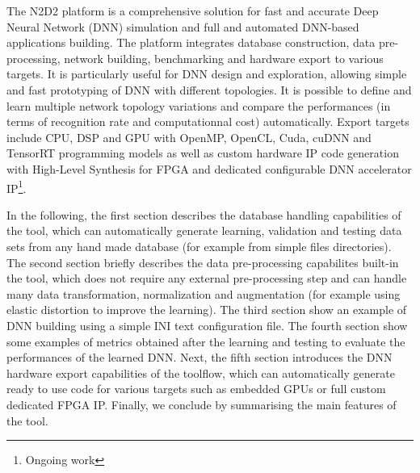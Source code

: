 \documentclass[a4paper,11pt,oneside]{article}
\newif\iffullmanual
\begin{document}
\thispagestyle{empty}
\clearpage


\pagestyle{fancy}

\fancyhf{} %

\renewcommand{\footrulewidth}{0.4pt}%

\fancyfoot[R]{\thepage/\pageref{LastPage}}


\iffullmanual
\setcounter{tocdepth}{4}
\tableofcontents
\clearpage


\section{Presentation}
\fi

The N2D2 platform is a comprehensive solution for fast and accurate Deep Neural
Network (DNN) simulation and full and automated DNN-based applications
building. The platform integrates database construction, data pre-processing,
network building, benchmarking and hardware export to various targets. It is
particularly useful for DNN design and exploration, allowing simple and fast
prototyping of DNN with different topologies. It is possible to define and
learn multiple network topology variations and compare the performances (in
terms of recognition rate and computationnal cost) automatically.
Export targets include CPU, DSP and GPU with OpenMP, OpenCL, Cuda, cuDNN and
TensorRT programming models as well as custom hardware IP code generation with
High-Level Synthesis for FPGA and dedicated configurable DNN accelerator
IP\footnote{Ongoing work}.

In the following, the first section describes the database handling capabilities
of the tool, which can automatically generate learning, validation and testing
data sets from any hand made database (for example from simple files
directories). The second section briefly describes the data pre-processing
capabilites built-in the tool, which does not require any external
pre-processing step and can handle many data transformation, normalization and
augmentation (for example using elastic distortion to improve the learning).
The third section show an example of DNN building using a simple INI text
configuration file. The fourth section show some examples of metrics obtained
after the learning and testing to evaluate the performances of the learned DNN.
Next, the fifth section introduces the DNN hardware export capabilities of the
toolflow, which can automatically generate ready to use code for various
targets such as embedded GPUs or full custom dedicated FPGA IP. Finally, we
conclude by summarising the main features of the tool.
\end{document}
